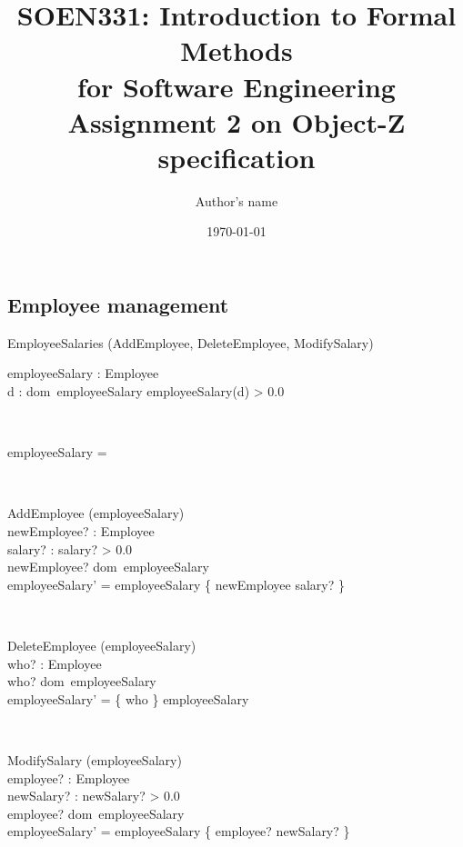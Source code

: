 \documentclass[12pt]{article}
\title{SOEN331: Introduction to Formal Methods\\for Software Engineering\\
Assignment 2 on Object-Z specification}
\author{Author's name}
\date{\today}
\begin{document}
\begin{spacing}{1.5}

\maketitle

\newpage

\section{Employee management}

\begin{class}{EmployeeSalaries}
\also
\upharpoonright (AddEmployee, DeleteEmployee, ModifySalary) \\
\begin{state}
employeeSalary : Employee \pfun {}\\
\where
\forall d : dom~employeeSalary \bullet employeeSalary(d) > 0.0
\end{state} \\
\begin{init}
employeeSalary = \emptyset %
\end{init} \\
\begin{op}{AddEmployee}
\Delta (employeeSalary) \\
newEmployee? : Employee\\
salary? : 
\ST
salary? > 0.0 \\
newEmployee? \notin dom~employeeSalary\\
employeeSalary' = employeeSalary \cup \{ newEmployee \mapsto salary? \}
\end{op}\\
\begin{op}{DeleteEmployee}
\Delta (employeeSalary) \\
who? : Employee\\
\ST
who? \in dom~employeeSalary\\
employeeSalary' = \{ who \} \ndres employeeSalary
\end{op}\\
\begin{op}{ModifySalary}
\Delta (employeeSalary) \\
employee? : Employee\\
newSalary? : 
\ST
newSalary? > 0.0 \\
employee? \in dom~employeeSalary\\
employeeSalary' = employeeSalary \oplus \{ employee? \mapsto newSalary? \}
\end{op}\\
\end{class}





\end{spacing}
\end{document}
